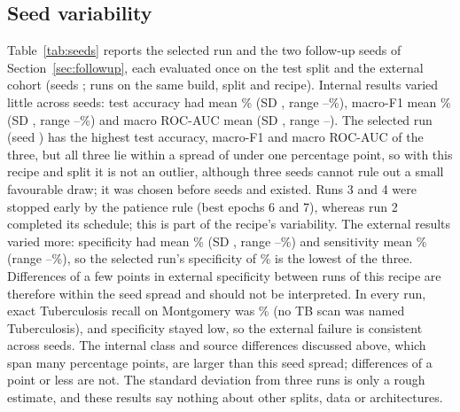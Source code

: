 \subsection{Seed variability}
\label{sec:res-seeds}
Table~\ref{tab:seeds} reports the selected run and the two follow-up seeds of Section~\ref{sec:followup}, each evaluated once on the test split and the external cohort (seeds \RMSSeeds; \RMSNRuns{} runs on the same build, split and recipe). Internal results varied little across seeds: test accuracy had mean \RMSTestAccMean\% (SD \RMSTestAccSD, range \RMSTestAccMin--\RMSTestAccMax\%), macro-F1 mean \RMSTestMacroFOneMean\% (SD \RMSTestMacroFOneSD, range \RMSTestMacroFOneMin--\RMSTestMacroFOneMax\%) and macro ROC-AUC mean \RMSTestMacroAUCMean{} (SD \RMSTestMacroAUCSD, range \RMSTestMacroAUCMin--\RMSTestMacroAUCMax). The selected run (seed \RMSRunOneSeed) has the highest test accuracy, macro-F1 and macro ROC-AUC of the three, but all three lie within a spread of under one percentage point, so with this recipe and split it is not an outlier, although three seeds cannot rule out a small favourable draw; it was chosen before seeds \RMSRunTwoSeed{} and \RMSRunThreeSeed{} existed. Runs 3 and 4 were stopped early by the patience rule (best epochs 6 and 7), whereas run 2 completed its schedule; this is part of the recipe's variability. The external results varied more: specificity had mean \RMSExtSpecMean\% (SD \RMSExtSpecSD, range \RMSExtSpecMin--\RMSExtSpecMax\%) and sensitivity mean \RMSExtSensMean\% (range \RMSExtSensMin--\RMSExtSensMax\%), so the selected run's specificity of \RMSRunOneExtSpec\% is the lowest of the three. Differences of a few points in external specificity between runs of this recipe are therefore within the seed spread and should not be interpreted. In every run, exact Tuberculosis recall on Montgomery was \RMSExtTBMean\% (no TB scan was named Tuberculosis), and specificity stayed low, so the external failure is consistent across seeds. The internal class and source differences discussed above, which span many percentage points, are larger than this seed spread; differences of a point or less are not. The standard deviation from three runs is only a rough estimate, and these results say nothing about other splits, data or architectures.

